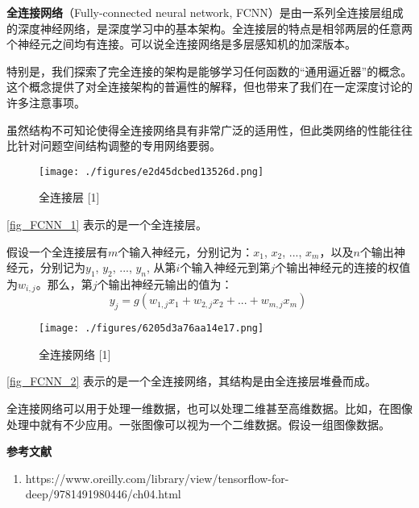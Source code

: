 



\textbf{全连接网络}（Fully-connected neural network, FCNN）是由一系列全连接层组成的深度神经网络，是深度学习中的基本架构。全连接层的特点是相邻两层的任意两个神经元之间均有连接。可以说全连接网络是多层感知机的加深版本。

特别是，我们探索了完全连接的架构是能够学习任何函数的“通用逼近器”的概念。这个概念提供了对全连接架构的普遍性的解释，但也带来了我们在一定深度讨论的许多注意事项。

虽然结构不可知论使得全连接网络具有非常广泛的适用性，但此类网络的性能往往比针对问题空间结构调整的专用网络要弱。

\begin{figure}[ht]
\centering
\texttt{[image: ./figures/e2d45dcbed13526d.png]}
\caption{全连接层 [1]} \label{fig_FCNN_1}
\end{figure}
\autoref{fig_FCNN_1} 表示的是一个全连接层。

假设一个全连接层有$m$个输入神经元，分别记为：$x_1$, $x_2$, ..., $x_m$，以及$n$个输出神经元，分别记为$y_1$, $y_2$, ..., $y_n$, 从第$i$个输入神经元到第$j$个输出神经元的连接的权值为$w_{i,j}$。那么，第$j$个输出神经元输出的值为：
\begin{equation}
y_j=g(w_{1,j}x_1+w_{2,j}x_2+...+w_{m,j}x_m)~
\end{equation}



\begin{figure}[ht]
\centering
\texttt{[image: ./figures/6205d3a76aa14e17.png]}
\caption{全连接网络 [1]} \label{fig_FCNN_2}
\end{figure}
\autoref{fig_FCNN_2} 表示的是一个全连接网络，其结构是由全连接层堆叠而成。

全连接网络可以用于处理一维数据，也可以处理二维甚至高维数据。比如，在图像处理中就有不少应用。一张图像可以视为一个二维数据。假设一组图像数据。



\textbf{参考文献}
\begin{enumerate}
\item https://www.oreilly.com/library/view/tensorflow-for-deep/9781491980446/ch04.html
\end{enumerate}